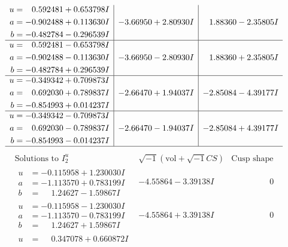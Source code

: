\documentclass[1p]{elsarticle_modified}
\theoremstyle{definition}
\newcommand{\I}{\sqrt{-1}}
\begin{document}
$$\begin{array}{c|c|c}
\begin{aligned}
u &= \phantom{-}0.592481 + 0.653798 I \\
a &= -0.902488 + 0.113630 I \\
b &= -0.482784 - 0.296539 I\end{aligned}
 & -3.66950 + 2.80930 I & \phantom{-}1.88360 - 2.35805 I \\ \hline\begin{aligned}
u &= \phantom{-}0.592481 - 0.653798 I \\
a &= -0.902488 - 0.113630 I \\
b &= -0.482784 + 0.296539 I\end{aligned}
 & -3.66950 - 2.80930 I & \phantom{-}1.88360 + 2.35805 I \\ \hline\begin{aligned}
u &= -0.349342 + 0.709873 I \\
a &= \phantom{-}0.692030 + 0.789837 I \\
b &= -0.854993 + 0.014237 I\end{aligned}
 & -2.66470 + 1.94037 I & -2.85084 - 4.39177 I \\ \hline\begin{aligned}
u &= -0.349342 - 0.709873 I \\
a &= \phantom{-}0.692030 - 0.789837 I \\
b &= -0.854993 - 0.014237 I\end{aligned}
 & -2.66470 - 1.94037 I & -2.85084 + 4.39177 I\\
 \hline 
 \end{array}$$\newpage$$\begin{array}{c|c|c}  
\text{Solutions to }I^u_{2}& \I (\text{vol} + \sqrt{-1}CS) & \text{Cusp shape}\\
 \hline 
\begin{aligned}
u &= -0.115958 + 1.230030 I \\
a &= -1.113570 + 0.783199 I \\
b &= \phantom{-}1.24627 - 1.59867 I\end{aligned}
 & -4.55864 - 3.39138 I & \phantom{-0.000000 } 0 \\ \hline\begin{aligned}
u &= -0.115958 - 1.230030 I \\
a &= -1.113570 - 0.783199 I \\
b &= \phantom{-}1.24627 + 1.59867 I\end{aligned}
 & -4.55864 + 3.39138 I & \phantom{-0.000000 } 0 \\ \hline\begin{aligned}
u &= \phantom{-}0.347078 + 0.660872 I \\

\end{aligned}
\end{array}$$
\end{document}
